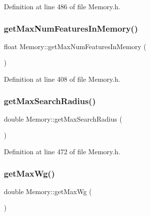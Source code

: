 Definition at line 486 of file Memory.\+h.

\mbox{\label{class_memory_ab744bd3c27190554606e4ed4ed8ce44d}} 
\subsubsection{\texorpdfstring{get\+Max\+Num\+Features\+In\+Memory()}{getMaxNumFeaturesInMemory()}}
{\footnotesize\ttfamily float Memory\+::get\+Max\+Num\+Features\+In\+Memory (\begin{DoxyParamCaption}{ }\end{DoxyParamCaption})\hspace{0.3cm}{\ttfamily [inline]}}



Definition at line 408 of file Memory.\+h.

\mbox{\label{class_memory_a0317f4f9b25f51ed57b53971439b93de}} 
\subsubsection{\texorpdfstring{get\+Max\+Search\+Radius()}{getMaxSearchRadius()}}
{\footnotesize\ttfamily double Memory\+::get\+Max\+Search\+Radius (\begin{DoxyParamCaption}{ }\end{DoxyParamCaption})\hspace{0.3cm}{\ttfamily [inline]}}



Definition at line 472 of file Memory.\+h.

\mbox{\label{class_memory_a094aabdbe0f06bb5a5db61645cead64b}} 
\subsubsection{\texorpdfstring{get\+Max\+Wg()}{getMaxWg()}}
{\footnotesize\ttfamily double Memory\+::get\+Max\+Wg (\begin{DoxyParamCaption}{ }\end{DoxyParamCaption})\hspace{0.3cm}{\ttfamily [inline]}}



